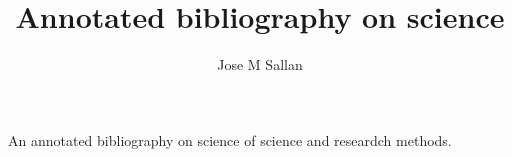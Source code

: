\documentclass[12pt]{article}
\title{Annotated bibliography on science}
\author{Jose M Sallan}
\date{}
\begin{document}
\maketitle

An annotated bibliography on science of science and researdch methods.

\nocite{*}



\end{document}
